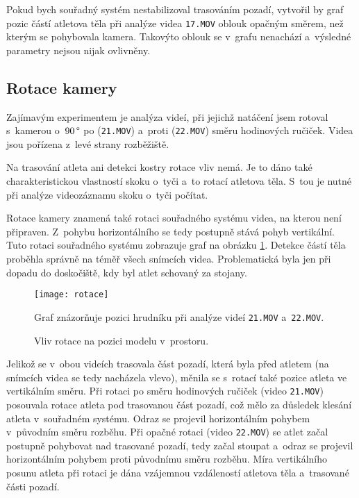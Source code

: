 Pokud bych souřadný systém nestabilizoval trasováním pozadí, vytvořil by graf pozic částí atletova těla při analýze videa \texttt{17.MOV} oblouk opačným směrem, než kterým se pohybovala kamera. Takovýto oblouk se v~grafu nenachází a~výsledné parametry nejsou nijak ovlivněny.



\subsection{Rotace kamery}

Zajímavým experimentem je analýza videí, při jejichž natáčení jsem rotoval s~kamerou o~$90\,\rm \degree$ po (\texttt{21.MOV}) a~proti (\texttt{22.MOV}) směru hodinových ručiček. Videa jsou pořízena z~levé strany rozběžiště.

Na trasování atleta ani detekci kostry rotace vliv nemá. Je to dáno také charakteristickou vlastností skoku o~tyči a~to rotací atletova těla. S~tou je nutné při analýze videozáznamu skoku o~tyči počítat.

Rotace kamery znamená také rotaci souřadného systému videa, na kterou není připraven. Z~pohybu horizontálního se tedy postupně stává pohyb vertikální. Tuto rotaci souřadného systému zobrazuje graf na obrázku \ref{fig:rotace}. Detekce částí těla proběhla správně na téměř všech snímcích videa. Problematická byla jen při dopadu do doskočiště, kdy byl atlet schovaný za stojany.

\begin{figure}[h]\centering
    \texttt{[image: rotace]}
    \caption{Vliv rotace na pozici modelu v~prostoru.}
    \small
    Graf znázorňuje pozici hrudníku při analýze videí \texttt{21.MOV} a~\texttt{22.MOV}.
    \label{fig:rotace}
\end{figure}

Jelikož se v~obou videích trasovala část pozadí, která byla před atletem (na snímcích videa se tedy nacházela vlevo), měnila se s~rotací také pozice atleta ve vertikálním směru. Při rotaci po směru hodinových ručiček (video \texttt{21.MOV}) posouvala rotace atleta pod trasovanou část pozadí, což mělo za důsledek klesání atleta v~souřadném systému. Odraz se projevil horizontálním pohybem v~původním směru rozběhu. Při opačné rotaci (video \texttt{22.MOV}) se atlet začal postupně pohybovat nad trasované pozadí, tedy začal stoupat a~odraz se projevil horizontálním pohybem proti původnímu směru rozběhu. Míra vertikálního posunu atleta při rotaci je dána vzájemnou vzdáleností atletova těla a~trasované části pozadí.

